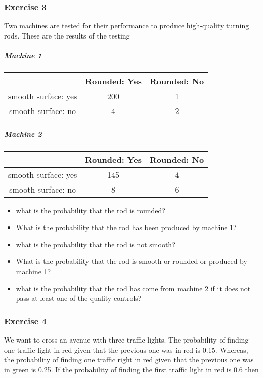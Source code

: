 \documentclass[
]{book}
\providecommand{\tightlist}{%
  \setlength{\itemsep}{0pt}\setlength{\parskip}{0pt}}
\begin{document}
\hypertarget{exercise-3}{%
\subsubsection{Exercise 3}\label{exercise-3}}

Two machines are tested for their performance to produce high-quality turning rods. These are the results of the testing

\hypertarget{machine-1}{%
\subparagraph{Machine 1}\label{machine-1}}

\begin{longtable}[]{@{}ccc@{}}
\toprule
& Rounded: Yes & Rounded: No \\
\midrule
\endhead
smooth surface: yes & 200 & 1 \\
smooth surface: no & 4 & 2 \\
\bottomrule
\end{longtable}

\hypertarget{machine-2}{%
\subparagraph{Machine 2}\label{machine-2}}

\begin{longtable}[]{@{}ccc@{}}
\toprule
& Rounded: Yes & Rounded: No \\
\midrule
\endhead
smooth surface: yes & 145 & 4 \\
smooth surface: no & 8 & 6 \\
\bottomrule
\end{longtable}

\begin{itemize}
\tightlist
\item
  what is the probability that the rod is rounded?
\item
  What is the probability that the rod has been produced by machine 1?
\item
  what is the probability that the rod is not smooth?
\item
  What is the probability that the rod is smooth or rounded or produced by machine 1?
\item
  what is the probability that the rod has come from machine 2 if it does not pass at least one of the quality controls?
\end{itemize}

\hypertarget{exercise-4}{%
\subsubsection{Exercise 4}\label{exercise-4}}

We want to cross an avenue with three traffic lights. The probability of finding one traffic light in red given that the previous one was in red is 0.15. Whereas, the probability of finding one traffic right in red given that the previous one was in green is 0.25. If the probability of finding the first traffic light in red is 0.6 then
\end{document}
